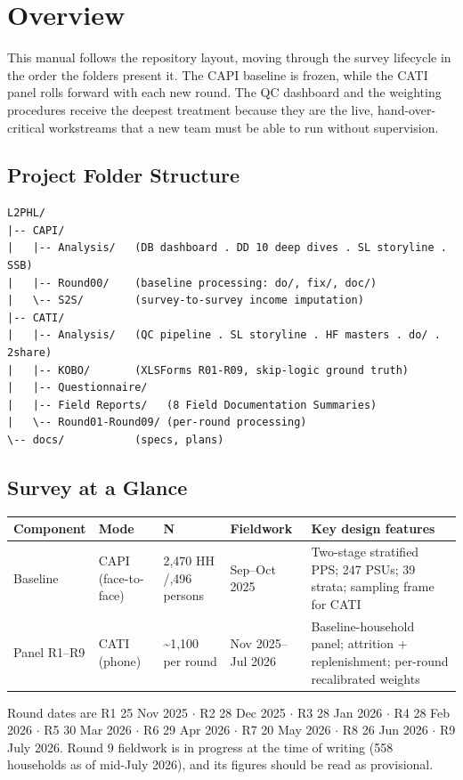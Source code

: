 
\section*{Overview}

This manual follows the repository layout, moving through the survey lifecycle in
the order the folders present it. The CAPI baseline is frozen, while the CATI
panel rolls forward with each new round. The QC dashboard and the weighting
procedures receive the deepest treatment because they are the live,
hand-over-critical workstreams that a new team must be able to run without
supervision.

\subsection*{Project Folder Structure}

\begin{refbox}
{\footnotesize
\begin{verbatim}
L2PHL/
|-- CAPI/
|   |-- Analysis/   (DB dashboard . DD 10 deep dives . SL storyline . SSB)
|   |-- Round00/    (baseline processing: do/, fix/, doc/)
|   \-- S2S/        (survey-to-survey income imputation)
|-- CATI/
|   |-- Analysis/   (QC pipeline . SL storyline . HF masters . do/ . 2share)
|   |-- KOBO/       (XLSForms R01-R09, skip-logic ground truth)
|   |-- Questionnaire/
|   |-- Field Reports/   (8 Field Documentation Summaries)
|   \-- Round01-Round09/ (per-round processing)
\-- docs/           (specs, plans)
\end{verbatim}
}
\end{refbox}

\subsection*{Survey at a Glance}

\begin{table}[htbp]
\centering
\small
\setlength{\tabcolsep}{5pt}
\begin{tabular}{@{}p{2.1cm}p{2.3cm}p{2.6cm}p{2.4cm}>{\raggedright\arraybackslash}p{3.9cm}@{}}
\toprule
\textbf{Component} & \textbf{Mode} & \textbf{N} & \textbf{Fieldwork} & \textbf{Key design features} \\
\midrule
Baseline & CAPI (face-to-face) & 2,470 HH /\newline 10,496 persons & Sep--Oct 2025 &
Two-stage stratified PPS; 247 PSUs; 39 strata; sampling frame for CATI \\
\addlinespace
Panel R1--R9 & CATI (phone) & \textasciitilde1,100 per round & Nov 2025--Jul 2026 &
Baseline-household panel; attrition + replenishment; per-round recalibrated weights \\
\bottomrule
\end{tabular}
\end{table}

Round dates are R1 25 Nov 2025 $\cdot$ R2 28 Dec 2025 $\cdot$ R3 28 Jan 2026
$\cdot$ R4 28 Feb 2026 $\cdot$ R5 30 Mar 2026 $\cdot$ R6 29 Apr 2026 $\cdot$ R7
20 May 2026 $\cdot$ R8 26 Jun 2026 $\cdot$ R9 July 2026. Round 9 fieldwork is in
progress at the time of writing (558 households as of mid-July 2026), and its
figures should be read as provisional.
